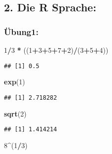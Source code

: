 \documentclass[
]{article}
\newenvironment{Shaded}{\begin{snugshade}}{\end{snugshade}}
\newcommand{\DecValTok}[1]{\textcolor[rgb]{0.00,0.00,0.81}{#1}}
\newcommand{\FunctionTok}[1]{\textcolor[rgb]{0.13,0.29,0.53}{\textbf{#1}}}
\newcommand{\NormalTok}[1]{#1}
\newcommand{\SpecialCharTok}[1]{\textcolor[rgb]{0.81,0.36,0.00}{\textbf{#1}}}
\begin{document}
\pagebreak

\hypertarget{die-r-sprache}{%
\subsection{2. Die R Sprache:}\label{die-r-sprache}}

\hypertarget{uxfcbung1}{%
\subsubsection{Übung1:}\label{uxfcbung1}}

\begin{Shaded}
\begin{Highlighting}[]
\DecValTok{1}\SpecialCharTok{/}\DecValTok{3} \SpecialCharTok{*}\NormalTok{ ((}\DecValTok{1}\SpecialCharTok{+}\DecValTok{3}\SpecialCharTok{+}\DecValTok{5}\SpecialCharTok{+}\DecValTok{7}\SpecialCharTok{+}\DecValTok{2}\NormalTok{)}\SpecialCharTok{/}\NormalTok{(}\DecValTok{3}\SpecialCharTok{+}\DecValTok{5}\SpecialCharTok{+}\DecValTok{4}\NormalTok{))}
\end{Highlighting}
\end{Shaded}

\begin{verbatim}
## [1] 0.5
\end{verbatim}

\begin{Shaded}
\begin{Highlighting}[]
\FunctionTok{exp}\NormalTok{(}\DecValTok{1}\NormalTok{)}
\end{Highlighting}
\end{Shaded}

\begin{verbatim}
## [1] 2.718282
\end{verbatim}

\begin{Shaded}
\begin{Highlighting}[]
\FunctionTok{sqrt}\NormalTok{(}\DecValTok{2}\NormalTok{)}
\end{Highlighting}
\end{Shaded}

\begin{verbatim}
## [1] 1.414214
\end{verbatim}

\begin{Shaded}
\begin{Highlighting}[]
\DecValTok{8}\SpecialCharTok{\^{}}\NormalTok{(}\DecValTok{1}\SpecialCharTok{/}\DecValTok{3}\NormalTok{)}
\end{Highlighting}
\end{Shaded}
\end{document}
